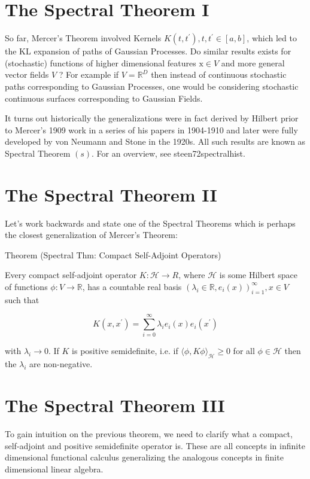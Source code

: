 \documentclass[11pt]{article}
\theoremstyle{plain} %
\theoremstyle{remark}
\begin{document}
\section*{The Spectral Theorem I}
So far, Mercer's Theorem involved Kernels $K\left(t, t^{\prime}\right), t,
t^{\prime} \in[a, b]$, which led to the KL expansion of paths of Gaussian
Processes. Do similar results exists for (stochastic) functions of higher
dimensional features $\mathrm{x} \in V$ and more general vector fields $V$ ? For
example if $V=\mathbb{R}^{D}$ then instead of continuous stochastic paths
corresponding to Gaussian Processes, one would be considering stochastic
continuous surfaces corresponding to Gaussian Fields.

It turns out historically the generalizations were in fact derived by Hilbert
prior to Mercer's 1909 work in a series of his papers in 1904-1910 and later
were fully developed by von Neumann and Stone in the 1920s. All such results are
known as Spectral Theorem $(s)$. For an overview, see steen72spectralhist.

\section*{The Spectral Theorem II}
Let's work backwards and state one of the Spectral Theorems which is perhaps the
closest generalization of Mercer's Theorem:

Theorem (Spectral Thm: Compact Self-Adjoint Operators)

Every compact self-adjoint operator $K: \mathcal{H} \rightarrow R$, where
$\mathcal{H}$ is some Hilbert space of functions $\phi: V \rightarrow
\mathbb{R}$, has a countable real basis $\left(\lambda_{i} \in \mathbb{R},
e_{i}(x)\right)_{i=1}^{\infty}, x \in V$ such that

$$
K\left(x, x^{\prime}\right)=\sum_{i=0}^{\infty} \lambda_{i} e_{i}(x) e_{i}\left(x^{\prime}\right)
$$

with $\lambda_{i} \rightarrow 0$. If $K$ is positive semidefinite, i.e. if
$\langle\phi, K \phi\rangle_{\mathcal{H}} \geq 0$ for all $\phi \in \mathcal{H}$
then the $\lambda_{i}$ are non-negative.

\section*{The Spectral Theorem III}
To gain intuition on the previous theorem, we need to clarify what a compact,
self-adjoint and positive semidefinite operator is. These are all concepts in
infinite dimensional functional calculus generalizing the analogous concepts in
finite dimensional linear algebra.
\end{document}
